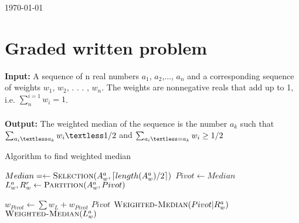 \documentclass[8pt]{article}
\DeclarePairedDelimiter\ceil{\lceil}{\rceil}
\begin{document}
\hfill \small{\today} \\
\setlength{\fboxrule}{.5mm}\setlength{\fboxsep}{1.2mm}
\newlength{\boxlength}\setlength{\boxlength}{\textwidth}
\addtolength{\boxlength}{-4mm}
\begin{center}\end{center}
\vspace{5mm}

\section{Graded written problem}

\textbf{Input:} A sequence of n real numbers $a_1$, $a_2$,..., $a_n$ and a corresponding sequence of weights $w_1$, $w_2$, . . . , $w_n$. The weights are nonnegative reals that add up to 1, i.e. $\sum_n^{i=1} w_i = 1$. \\
\\
\textbf{Output:} The weighted median of the sequence is the number $a_k$ such that
$\sum_{a_i \textless a_k} w_i \textless 1/2$ and $\sum_{a_i \textless= a_k} w_i \geq 1/2$

\begin{algorithm}
\caption{Algorithm to find weighted median}\label{euclid}
\begin{algorithmic}[1]

    \State {} 
\EndIf

\State $Median = \leftarrow \Call{Selection}{A_w^a, \ceil{length(A_w^a)/2}}$ 
    \State $Pivot \leftarrow Median$
    \State $L_{w}^{a},R_{w}^{r} \leftarrow \Call{Partition}{A_w^a, Pivot}$

        \State $w_{Pivot} \leftarrow \sum w_L + w_{Pivot}$
            \State \Return ${Pivot}$
        \EndIf
        \State $\Call{Weighted-Median}{Pivot|R_w^a}$
    \Else
        \State $\Call{Weighted-Median}{L_w^a}$
    \EndIf

\EndProcedure
\end{algorithmic}
\end{algorithm}
\end{document}
